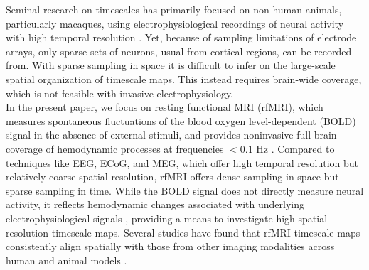 \documentclass[latex/main.tex]{subfiles}
\begin{document}
Seminal research on timescales has primarily focused on non-human animals, particularly macaques, using electrophysiological recordings of neural activity with high temporal resolution \citep{murray_hierarchy_2014, cirillo_neural_2018, nougaret_intrinsic_2021, manea_intrinsic_2022}. Yet, because of sampling limitations of electrode arrays, only sparse sets of neurons, usual from cortical regions, can be recorded from. With sparse sampling in space it is difficult to infer on the large-scale spatial organization of timescale maps. This instead requires brain-wide coverage, which is not feasible with invasive electrophysiology.\\

In the present paper, we focus on resting functional MRI (rfMRI), which measures spontaneous fluctuations of the blood oxygen level-dependent (BOLD) signal in the absence of external stimuli, and provides noninvasive full-brain coverage of hemodynamic processes at frequencies $<0.1$ Hz \citep{raut_hierarchical_2020, he_scale-free_2011}. Compared to techniques like EEG, ECoG, and MEG, which offer high temporal resolution but relatively coarse spatial resolution, rfMRI offers dense sampling in space but sparse sampling in time. While the BOLD signal does not directly measure neural activity, it reflects hemodynamic changes associated with underlying electrophysiological signals \citep{logothetis_what_2008}, providing a means to investigate high-spatial resolution timescale maps. Several studies have found that rfMRI timescale maps consistently align spatially with those from other imaging modalities across human and animal models \citep{raut_hierarchical_2020, shafiei_topographic_2020, lurie_cortical_2024, mitra_lag_2014, kaneoke_variance_2012, wengler_distinct_2020, shinn_functional_2023, manea_intrinsic_2022, ito_cortical_2020, muller_core_2020}. \\
\end{document}
